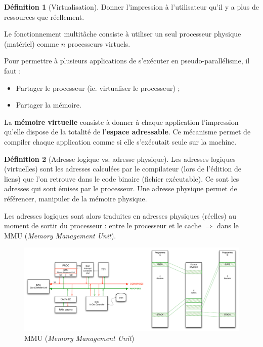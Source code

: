 \documentclass[11pt,english,french]{scrreprt}
\theoremstyle{remark}
\theoremstyle{definition}
\newtheorem*{def*}{Définition}
\begin{document}
\begin{def*}[Virtualisation]
	Donner l'impression à l'utilisateur qu'il y a plus de ressources que réellement.
	
	Le fonctionnement multitâche consiste à utiliser un seul processeur physique (matériel) comme $n$ processeurs virtuels.
\end{def*}

Pour permettre à plusieurs applications de s'exécuter en pseudo-parallélisme, il faut :\begin{itemize}
	\item Partager le processeur (ie. virtualiser le processeur) ;
	\item Partager la mémoire.
\end{itemize}

La \textbf{mémoire virtuelle} consiste à donner à chaque application l'impression qu'elle dispose de la totalité de l'\textbf{espace adressable}. Ce mécanisme permet de compiler chaque application comme si elle s'exécutait seule sur la machine.

\begin{def*}[Adresse logique vs. adresse physique]
	Les adresses logiques (virtuelles) sont les adresses calculées par le compilateur (lors de l'édition de liens) que l'on retrouve dans le code binaire (fichier exécutable). Ce sont les adresses qui sont émises par le processeur. Une adresse physique permet de référencer, manipuler de la mémoire physique.
	
	Les adresses logiques sont alors traduites en adresses physiques (réelles) au moment de sortir du processeur : entre le processeur et le cache $\Rightarrow$ dans le MMU (\emph{Memory Management Unit}).
\end{def*}

\begin{figure}[!h]
	\center
	\includegraphics[scale=.40]{diagrammes/MMU}
	\caption{MMU (\emph{Memory Management Unit})}
\end{figure}
\end{document}
